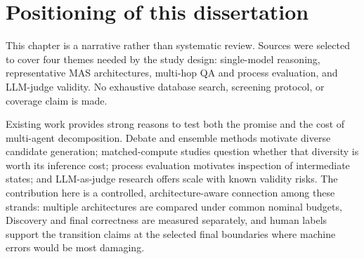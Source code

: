 \section{Positioning of this dissertation}

This chapter is a narrative rather than systematic review. Sources were selected to cover four themes needed by the study design: single-model reasoning, representative MAS architectures, multi-hop QA and process evaluation, and LLM-judge validity. No exhaustive database search, screening protocol, or coverage claim is made.

Existing work provides strong reasons to test both the promise and the cost of multi-agent decomposition. Debate and ensemble methods motivate diverse candidate generation; matched-compute studies question whether that diversity is worth its inference cost; process evaluation motivates inspection of intermediate states; and LLM-as-judge research offers scale with known validity risks. The contribution here is a controlled, architecture-aware connection among these strands: multiple architectures are compared under common nominal budgets, Discovery and final correctness are measured separately, and human labels support the transition claims at the selected final boundaries where machine errors would be most damaging.
